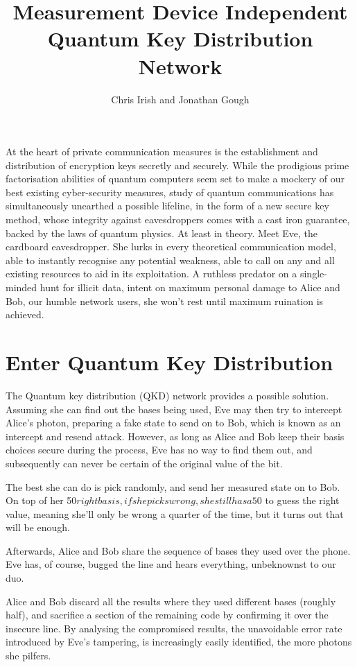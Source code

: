 \documentclass[journal]{vgtc}
\title{Measurement Device Independent Quantum Key Distribution Network}
\author{Chris Irish and Jonathan Gough}
\begin{document}

\maketitle

At the heart of private communication measures is the
establishment and distribution of encryption keys secretly
and securely.
While the prodigious prime factorisation
abilities of quantum computers seem set to make a
mockery of our best existing cyber-security
measures, study of quantum
communications has simultaneously unearthed a possible
lifeline, in the form of a new secure key method, whose
integrity against eavesdroppers comes with a cast iron
guarantee, backed by the laws of quantum physics. At
least in theory.
Meet Eve, the cardboard eavesdropper. She lurks in every
theoretical communication model, able to instantly
recognise any potential weakness, able to call on any and
all existing resources to aid in its exploitation. A ruthless predator on a single-minded hunt
for illicit data, intent on maximum personal damage to Alice and Bob, our humble network users, she won't rest until maximum ruination is achieved.


\section{Enter Quantum Key Distribution}



The Quantum key distribution (QKD) network provides a possible solution. Assuming she can find out the bases being used, Eve may then try to intercept Alice's photon, preparing a fake state to send on to Bob, which is known as an intercept and resend attack. However, as long as Alice and Bob keep their basis choices secure during the process, Eve has no way to find them out, and subsequently can never be certain of the original value of the bit.

The best she can do is
pick randomly, and send her measured state on to Bob. On top of her 50$%
right basis, if she picks wrong, she still has a 50$%
to guess the right value, meaning she’ll only be wrong a
quarter of the time, but it turns out that will be enough.

Afterwards, Alice and Bob share the sequence of bases
they used over the phone. Eve has, of course, bugged the
line and hears everything, unbeknownst to our duo.

Alice and Bob discard all the results where they used different bases
(roughly half), and sacrifice a section of the remaining
code by confirming it over the insecure line. By analysing
the compromised results, the unavoidable error rate introduced by
Eve’s tampering, is increasingly easily
identified, the more photons she pilfers.
\end{document}
